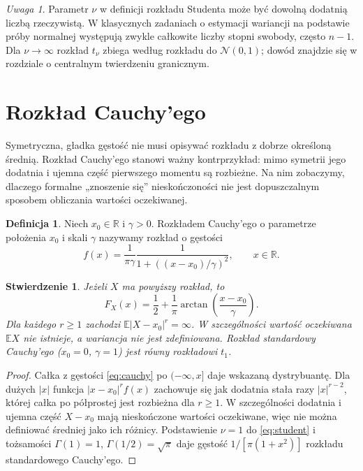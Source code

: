 \documentclass[11pt,a4paper,oneside]{report}
\numberwithin{equation}{chapter}
\theoremstyle{plain}
\newtheorem{stwierdzenie}[twierdzenie]{Stwierdzenie}
\theoremstyle{definition}
\newtheorem{definicja}{Definicja}[chapter]
\theoremstyle{remark}
\newtheorem{uwaga}{Uwaga}[chapter]
\newcommand{\R}{\mathbb{R}}
\newcommand{\E}{\mathbb{E}}
\newcommand{\Normal}{\mathcal{N}}
\begin{document}
\begin{uwaga}
Parametr $\nu$ w definicji rozkładu Studenta może być dowolną
dodatnią liczbą rzeczywistą. W klasycznych zadaniach o estymacji
wariancji na podstawie próby normalnej występują zwykle całkowite
liczby stopni swobody, często $n-1$.
Dla $\nu\to\infty$ rozkład $t_\nu$ zbiega według rozkładu
do $\Normal(0,1)$; dowód znajdzie się w rozdziale
o centralnym twierdzeniu granicznym.
\end{uwaga}

\section{Rozkład Cauchy'ego}
Symetryczna, gładka gęstość nie musi opisywać rozkładu z dobrze
określoną średnią. Rozkład Cauchy'ego stanowi ważny kontrprzykład:
mimo symetrii jego dodatnia i ujemna część pierwszego momentu
są rozbieżne. Na nim zobaczymy, dlaczego formalne „znoszenie się”
nieskończoności nie jest dopuszczalnym sposobem obliczania
wartości oczekiwanej.

\begin{definicja}
Niech $x_0\in\R$ i $\gamma>0$. Rozkładem Cauchy'ego
o parametrze położenia $x_0$ i skali $\gamma$
nazywamy rozkład o gęstości
\begin{equation}\label{eq:cauchy}
f(x)=\frac1{\pi\gamma}
\frac{1}{1+((x-x_0)/\gamma)^2},\qquad x\in\R.
\end{equation}
\end{definicja}

\begin{stwierdzenie}
Jeżeli $X$ ma powyższy rozkład, to
\[
F_X(x)=\frac12+\frac1\pi
\arctan\!\left(\frac{x-x_0}{\gamma}\right).
\]
Dla każdego $r\geq1$ zachodzi $\E|X-x_0|^r=\infty$.
W szczególności wartość oczekiwana $\E X$ nie istnieje,
a wariancja nie jest zdefiniowana.
Rozkład standardowy Cauchy'ego ($x_0=0$, $\gamma=1$)
jest równy rozkładowi $t_1$.
\end{stwierdzenie}
\begin{proof}
Całka z gęstości \eqref{eq:cauchy} po $(-\infty,x]$
daje wskazaną dystrybuantę.
Dla dużych $|x|$ funkcja $|x-x_0|^r f(x)$
zachowuje się jak dodatnia stała razy $|x|^{r-2}$,
której całka po półprostej jest rozbieżna dla $r\geq1$.
W szczególności dodatnia i ujemna część
$X-x_0$ mają nieskończone wartości oczekiwane,
więc nie można definiować średniej jako ich różnicy.
Podstawienie $\nu=1$ do \eqref{eq:student} i tożsamości
$\Gamma(1)=1$, $\Gamma(1/2)=\sqrt\pi$ daje gęstość
$1/[\pi(1+x^2)]$ rozkładu standardowego Cauchy'ego.
\end{proof}
\end{document}
